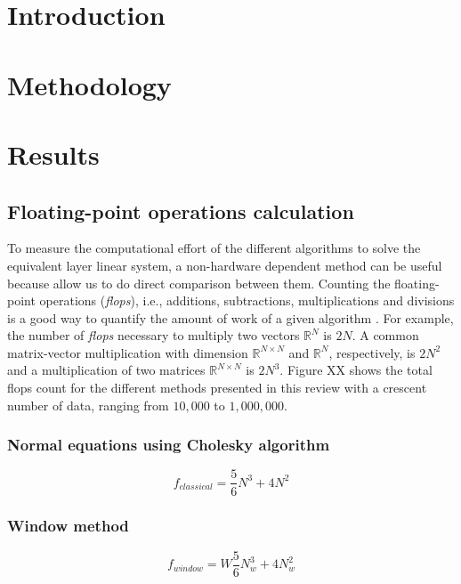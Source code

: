 \documentclass[utf8]{FrontiersinHarvard} %
\begin{document}
\section{Introduction}

\section{Methodology}

\section{Results}

\subsection{Floating-point operations calculation}

To measure the computational effort of the different algorithms to solve the equivalent layer linear system, a non-hardware dependent method can be useful because allow us to do direct comparison between them. Counting the floating-point operations (\textit{flops}), i.e., additions, subtractions, multiplications and divisions is a good way to quantify the amount of work of a given algorithm \citep{golub-vanloan2013}. For example, the number of \textit{flops} necessary to multiply two vectors $\mathbb{R}^{N}$ is $2N$. A common matrix-vector multiplication with dimension $\mathbb{R}^{N \times N}$ and $\mathbb{R}^{N}$, respectively, is $2N^2$ and a multiplication of two matrices $\mathbb{R}^{N \times N}$ is $2N^3$. Figure XX shows the total flops count for the different methods presented in this review with a crescent number of data, ranging from $10,000$ to $1,000,000$. 

\subsubsection{Normal equations using Cholesky algorithm}

\begin{equation}
	f_{classical} = \dfrac{5}{6} N^3 + 4N^2
\label{flops_classical}
\end{equation}

\subsubsection{Window method \citep{leao-silva1989}}

\begin{equation}
	f_{window} = W\dfrac{5}{6} N_w^3 + 4N_w^2
\label{flops_leao-silva}
\end{equation}
\end{document}
